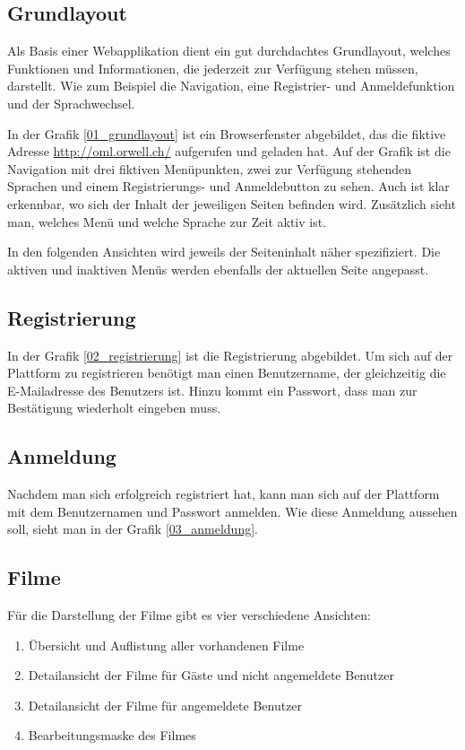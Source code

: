 \subsection{Grundlayout}
Als Basis einer Webapplikation dient ein gut durchdachtes Grundlayout, welches
Funktionen und Informationen, die jederzeit zur Verfügung stehen müssen, darstellt.
Wie zum Beispiel die Navigation, eine Registrier- und Anmeldefunktion und der Sprachwechsel.

In der Grafik \ref{01_grundlayout} ist ein Browserfenster abgebildet, das die
fiktive Adresse \url{http://oml.orwell.ch/} aufgerufen und geladen hat. Auf der Grafik
ist die Navigation mit drei fiktiven Menüpunkten, zwei zur Verfügung stehenden 
Sprachen und einem Registrierungs- und Anmeldebutton zu sehen. Auch ist klar erkennbar,
wo sich der Inhalt der jeweiligen Seiten befinden wird. Zusätzlich sieht man, welches
Menü und welche Sprache zur Zeit aktiv ist.

In den folgenden Ansichten wird jeweils der Seiteninhalt näher spezifiziert. Die
aktiven und inaktiven Menüs werden ebenfalls der aktuellen Seite angepasst.

\subsection{Registrierung}
In der Grafik \ref{02_registrierung} ist die Registrierung abgebildet. Um sich
auf der Plattform zu registrieren benötigt man einen Benutzername, der gleichzeitig
die E-Mailadresse des Benutzers ist. Hinzu kommt ein Passwort, dass man zur 
Bestätigung wiederholt eingeben muss.

\subsection{Anmeldung}
Nachdem man sich erfolgreich registriert hat, kann man sich auf der Plattform
mit dem Benutzernamen und Passwort anmelden. Wie diese Anmeldung aussehen soll, sieht
man in der Grafik \ref{03_anmeldung}.

\subsection{Filme}
Für die Darstellung der Filme gibt es vier verschiedene Ansichten:

\begin{enumerate}
    \item Übersicht und Auflistung aller vorhandenen Filme
    \item Detailansicht der Filme für Gäste und nicht angemeldete Benutzer
    \item Detailansicht der Filme für angemeldete Benutzer
    \item Bearbeitungsmaske des Filmes
\end{enumerate}

